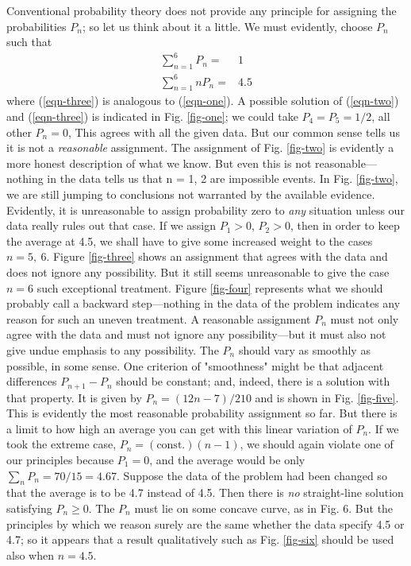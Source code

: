 \documentclass[]{article}
\begin{document}
Conventional probability theory does not provide any principle for assigning the probabilities $P_n$; so let us think about it a little. We must evidently, choose $P_n$ such that
\begin{align}
\sum_{n = 1}^{6} P_{n} = & 1  \label{eqn-two} \\
\sum_{n = 1}^{6} nP_{n} = & 4.5 \label{eqn-three}
\end{align}
where (\ref{eqn-three}) is analogous to (\ref{eqn-one}). A possible solution of (\ref{eqn-two}) and (\ref{eqn-three}) is indicated
in Fig. \ref{fig-one}; we could take \(P_{4} = P_{5} = 1/2\), all other
\(P_{n} = 0\), This agrees with all the given data. But our common sense
tells us it is not a \emph{reasonable} assignment. The assignment of
Fig. \ref{fig-two} is evidently a more honest description of what we know. But even
this is not reasonable---nothing in the data tells us that n = 1, 2 are
impossible events. In Fig. \ref{fig-two}, we are still jumping to conclusions not
warranted by the available evidence. Evidently, it is unreasonable to
assign probability zero to \emph{any} situation unless our data really rules
out that case. If we assign \(P_{1} > 0\), \(P_{2} > 0\), then in order
to keep the average at 4.5, we shall have to give some increased weight
to the cases \(n = 5,\ 6\). Figure \ref{fig-three} shows an assignment that agrees
with the data and does not ignore any possibility. But it still seems
unreasonable to give the case \(n = 6\) such exceptional treatment.
Figure \ref{fig-four} represents what we should probably call a
backward step---nothing in the data of the problem indicates any reason for such
an uneven treatment. A reasonable assignment \(P_{n}\) must not only
agree with the data and must not ignore any possibility---but
it must also not give undue emphasis to any possibility. The \(P_{n}\)
should vary as smoothly as possible, in some sense. One criterion of
"smoothness" might be that adjacent differences \(P_{n + 1} - P_{n}\)
should be constant; and, indeed, there is a solution with that property.
It is given by \(P_{n} = (12n - 7)/210\) and
is
shown in Fig. \ref{fig-five}. This is evidently the most reasonable probability
assignment so far. But there is a limit to how high an average you can
get with this linear variation of \(P_{n}\). If we took the extreme
case, \(P_{n} = (\text{const.})(n - 1)\), we should again violate one of our
principles because \(P_{1} = 0\), and the average would be only
\(\sum_{n}^{}{P_{n} = 70/15} = 4.67\). Suppose the data of the problem
had been changed so that the average is to be 4.7 instead of 4.5. Then
there is \emph{no} straight-line solution satisfying \(P_{n} \geq 0\). The
\(P_{n}\) must lie on some concave curve, as in Fig. 6. But the
principles by which we reason
surely are the same whether the data specify 4.5 or 4.7; so it appears that a
result qualitatively such as Fig. \ref{fig-six} should be used also when
\(n = 4.5\).
\end{document}
